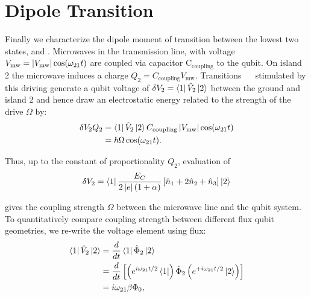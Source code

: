 \section{Dipole Transition}
\label{sec:dipole-transition}

\noindent  Finally we  characterize the  dipole moment  of transition  between the  lowest two
states,     and  .   Microwaves   in  the  transmission  line,   with  voltage
$   V_{\text{mw}}=   \left|V_{\text{mw}}\right|\cos(\omega_{21   }t)   $  are   coupled   via   capacitor
C$_{\text{coupling}}$  to   the  qubit.   On   island  2   the  microwave  induces   a  charge
$ Q_{2}=C_{\text{coupling}}V_{\text{mw}} $.  Transitions ~\ilra~ stimulated by
this driving  generate a qubit voltage  of $ \delta  V_2 = \Bra{1}\hat{V}_2\Ket{2} $  between the
ground and  island 2 and  hence draw an  electrostatic energy related  to the strength  of the
drive $\Omega$ by:
\begin{equation}
  \label{eq:dipoleEnergy}
  \begin{aligned}
    \delta V_{2}Q_{2} & = \Bra{1}\hat{V}_2\Ket{2} C_{\text{coupling}}\left|V_{\text{mw}}\right|\cos(\omega_{21}  t) \\
    & = \hbar\Omega\cos(\omega_{21}t).
  \end{aligned}
\end{equation}

\noindent Thus, up to the constant of proportionality $ Q_{2} $, evaluation of
\begin{equation}
  \label{eq:dv2}
  \delta     V_2     =\Bra{1}\frac{E_{C}}{2\left|e\right|(1+\alpha)}\left[\hat{n}_1     +     2\hat{n}_2     +
    \hat{n}_3\right]\Ket{2}
\end{equation}

\noindent gives the coupling strength $\Omega$ between  the microwave line and the qubit system. To
quantitatively compare coupling strength between  different flux qubit geometries, we re-write
the voltage element using flux:
\begin{equation}
  \label{eq:dipole_voltage_7}
  \begin{aligned}
    \Bra{1}\hat{V}_2 \Ket{2} & =  \frac{d}{dt}\Bra{1}\hat{\Phi}_2\Ket{2}\\
    & = \frac{d}{dt}\left[\left(e^{i\omega_{21}t/2}\Bra{1}\right) \hat{\Phi}_2\left(e^{+i\omega_{21}t/2}\Ket{2}\right)\right]\\
    & = {i\omega_{21}\beta\Phi_0},
  \end{aligned}
\end{equation}


